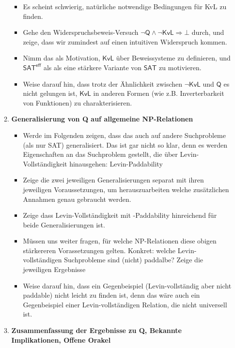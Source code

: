 \documentclass[nofonts]{uebung}
\begin{document}
\begin{enumerate}[label*=\arabic*.]
\begin{enumerate}[label*=\arabic*.]
\begin{itemize}
                \item Es scheint schwierig, natürliche notwendige Bedingungen für KvL zu finden. 
                \item Gehe den Widerspruchsbeweis-Versuch $\neg\mathsf{Q}\land \neg\mathsf{KvL}\Rightarrow\bot$ durch, und zeige, dass wir zumindest auf einen intuitiven Widerspruch kommen.
                \item Nimm das als Motivation, $\mathsf{KvL}$ über Beweissysteme zu definieren, und $\mathsf{SAT^{eff}}$ als als eine stärkere Variante von $\mathsf{SAT}$ zu motivieren.
                \item Weise darauf hin, dass trotz der Ähnlichkeit zwischen $\neg\mathsf{KvL}$ und $\mathsf{Q}$ es nicht gelungen ist, $\mathsf{KvL}$ in anderen Formen (wie z.B. Inverterbarkeit von Funktionen) zu charakterisieren.
            \end{itemize}
            \item \textbf{Generalisierung von Q auf allgemeine NP-Relationen}
            \begin{itemize}
                \item Werde im Folgenden zeigen, dass das auch auf andere Suchprobleme (als nur SAT) generalisiert. Das ist gar nicht so klar, denn es werden Eigenschaften an das Suchproblem gestellt, die über Levin-Vollständigkeit hinausgehen: Levin-Paddability
                \item Zeige die zwei jeweiligen Generalisierungen separat mit ihren jeweiligen Voraussetzungen, um herauszuarbeiten welche zusätzlichen Annahmen genau gebraucht werden.
                \item Zeige dass Levin-Vollständigkeit mit -Paddability hinreichend für beide Generalisierungen ist. 
                \item Müssen uns weiter fragen, für welche NP-Relationen diese obigen stärkereren Vorassetzungen gelten. Konkret: welche Levin-vollständigen Suchprobleme sind (nicht) paddalbe? Zeige die jeweiligen Ergebnisse
                \item Weise darauf hin, dass ein Gegenbeispiel (Levin-vollständig aber nicht paddable) nicht leicht zu finden ist, denn das wäre auch ein Gegenbeispiel einer Levin-vollständigen Relation, die nicht universell ist.
            \end{itemize}
            \item \textbf{Zusammenfassung der Ergebnisse zu Q, Bekannte Implikationen, Offene Orakel}
            \begin{itemize}

\end{itemize}
\end{enumerate}
\end{enumerate}
\end{document}
